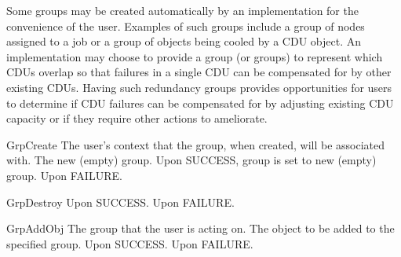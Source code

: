 Some groups may be created automatically by an implementation for the convenience of the user. Examples of such groups include
a group of nodes assigned to a job or a group of objects being cooled by a CDU object. An implementation may choose to provide
a group (or groups) to represent which CDUs overlap so that failures in a single CDU can be compensated for by other existing CDUs.
Having such redundancy groups provides opportunities for users to determine if CDU failures can be compensated for by adjusting
existing CDU capacity or if they require other actions to ameliorate. 

\begin{prototype}{GrpCreate}
		{\pInput} {The user's context that the group, when created, will be associated with.}
	   	{\pOutput}{The new (empty) group.}
	 	{Upon SUCCESS, group is set to new (empty) group.}
	 	{Upon FAILURE.}
\end{prototype}

\begin{prototype}{GrpDestroy}
	 	{Upon SUCCESS.}
	 	{Upon FAILURE.}
\end{prototype}

\begin{prototype}{GrpAddObj}
	 	{\pInputOutput}	{The group that the user is acting on.}
		{\pInput}       {The object to be added to the specified group.}
	 	{Upon SUCCESS.}
	 	{Upon FAILURE.}
\end{prototype}

